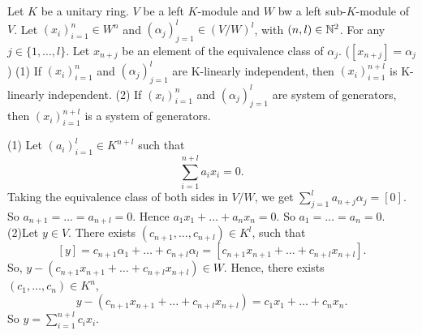 \begin{theoremenv}\label{6.10.5}
    Let $K$ be a unitary ring. $V$ be a left $K$-module  and $W$ bw a left sub-$K$-module of $V$. Let $(x_i)_{i=1}^{n}\in W^n$ and $\left(\alpha_j\right)_{j=1}^l\in \left(V/W\right)^l$, with $(n,l)\in \mathbb{N}^2$. For any $j\in \{1,\dots,l\}$. Let $x_{n+j}$ be an element of the equivalence class of $\alpha_j$. ($[x_{n+j}]=\alpha_j$)
    \newline
    (1) If $(x_i)_{i=1}^n$ and $(\alpha_j)_{j=1}^l$ are K-linearly independent, then $(x_i)_{i=1}^{n+l}$ is K-linearly independent.
    \newline
    (2) If $(x_i)_{i=1}^{n}$ and $(\alpha_j)_{j=1}^l$ are system of generators, then $(x_i)_{i=1}^{n+l}$ is a system of generators. 
\end{theoremenv}
\begin{proofenv}
    \quad\newline
    (1) Let $(a_i)_{i=1}^l\in K^{n+l}$ such that 
    $$\sum_{i=1}^{n+l}a_ix_i=0.$$
    Taking the equivalence class of both sides in $V/W$, we get $\displaystyle \sum_{j=1}^{l}a_{n+j}\alpha_j=[0]$. So $a_{n+1}=\dots=a_{n+l}=0$. Hence $a_1x_1+\dots+a_nx_n=0$. So $a_1=\dots=a_n=0$.
    \newline
    (2)Let $y\in V$. There exists $(c_{n+1},\dots,c_{n+l})\in K^l$, such that 
    $$[y]=c_{n+1}\alpha_1+\dots +c_{n+l}\alpha_l=[c_{n+1}x_{n+1}+\dots+c_{n+l}x_{n+l}].$$
    So, $y-\left(c_{n+1}x_{n+1}+\dots+c_{n+l}x_{n+l}\right)\in W$. Hence, there exists $(c_1,\dots,c_n)\in K^n$,
    $$y-\left(c_{n+1}x_{n+1}+\dots+c_{n+l}x_{n+l}\right)=c_1x_1+\dots+c_nx_n.$$
    So $\displaystyle y= \sum_{i=1}^{n+l}c_ix_i$.
\end{proofenv}


